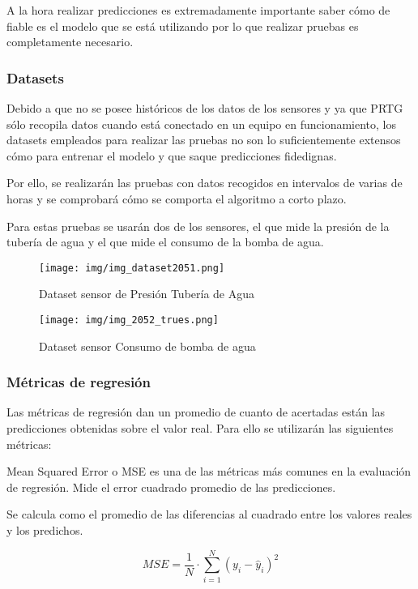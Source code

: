 A la hora realizar predicciones es extremadamente importante saber cómo de fiable es el modelo que se está utilizando por lo que realizar pruebas es completamente necesario.


\subsubsection{Datasets}
Debido a que no se posee históricos de los datos de los sensores y ya que PRTG sólo recopila datos cuando está conectado en un equipo en funcionamiento, los datasets empleados para realizar las pruebas no son lo suficientemente extensos cómo para entrenar el modelo y que saque predicciones fidedignas. 

Por ello, se realizarán las pruebas con datos recogidos en intervalos de varias de horas y se comprobará cómo se comporta el algoritmo a corto plazo.

Para estas pruebas se usarán dos de los sensores, el que mide la presión de la tubería de agua y el que mide el consumo de la bomba de agua.

\begin{figure}[h]
	\centering
	\texttt{[image: img/img\_dataset2051.png]}
	\caption{Dataset sensor de Presión Tubería de Agua}
	\label{img_prediccion_sensor2051}
\end{figure}

\begin{figure}[h]
	\centering
	\texttt{[image: img/img\_2052\_trues.png]}
	\caption{Dataset sensor Consumo de bomba de agua}
	\label{img_prediccion_sensor2051}
\end{figure}

\subsubsection{Métricas de regresión}

Las métricas de regresión dan un promedio de cuanto de acertadas están las predicciones obtenidas sobre el valor real. Para ello se utilizarán las siguientes métricas:


Mean Squared Error o MSE es una de las métricas más comunes en la evaluación de regresión. Mide el error cuadrado promedio de las predicciones.

Se calcula como el promedio de las diferencias al cuadrado entre los valores reales y los predichos.

\begin{equation*}
    MSE = \frac{1}{N} \cdot \sum_{i=1}^{N}(y_i - \hat{y}_i)^2
\end{equation*}

